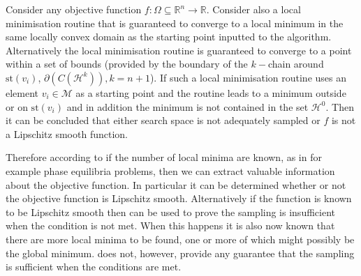 \begin{corollary} \label{corollary:smooth}
Consider any objective function $f : \Omega \subseteq \mathbb{R}^n \rightarrow \mathbb{R}$. Consider also a local minimisation routine that is guaranteed to converge to a local minimum in the same locally convex domain as the starting point inputted to the algorithm. Alternatively the local minimisation routine is guaranteed to converge to a point within a set of bounds (provided by the boundary of the $k-$chain around $\textrm{st}\left( v_i \right)$,  $\partial \left( C(\mathcal{H}^k) \right), k = n + 1$). If such a local minimisation routine  uses an element $v_i \in \mathcal{M}$ as a starting point and the routine leads to a minimum outside or on $\textrm{st}\left(v_{i}\right)$ and in addition the minimum is not contained in the set $\mathcal{H}^0$. Then it can be concluded that either search space is not adequately sampled or $f$ is not a Lipschitz smooth function.
\end{corollary}
Therefore according to  if the number of local minima are known, as in for example phase equilibria problems, then we can extract valuable information about the objective function. In particular it can be determined whether or not the objective function is Lipschitz smooth. Alternatively if the function is known to be Lipschitz smooth then  can be used to prove the sampling is insufficient when the condition is not met. When this happens it is also now known that there are more local minima to be found, one or more of which might possibly be the global minimum.  does not, however, provide any guarantee that the sampling is sufficient when the conditions are met.

